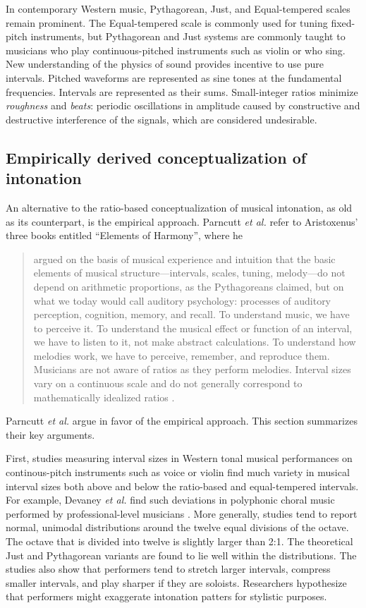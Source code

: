 In contemporary Western music, Pythagorean, Just, and Equal-tempered scales remain prominent. The Equal-tempered scale is commonly used for tuning fixed-pitch instruments, but Pythagorean and Just systems are commonly taught to musicians who play continuous-pitched instruments such as violin or who sing. New understanding of the physics of sound provides incentive to use pure intervals. Pitched waveforms are represented as sine tones at the fundamental frequencies. Intervals are represented as their sums. Small-integer ratios minimize \textit{roughness} and \textit{beats}: periodic oscillations in amplitude caused by constructive and destructive interference of the signals, which are considered undesirable.

\subsection{Empirically derived conceptualization of intonation}
\label{sec:empirical}
An alternative to the ratio-based conceptualization of musical intonation, as old as its counterpart, is the empirical approach. Parncutt \textit{et al.} refer to Aristoxenus' three books entitled ``Elements of Harmony'', where he \begin{quotation}argued on the basis of musical experience and intuition that the basic elements of musical structure---intervals, scales, tuning, melody---do not depend on arithmetic proportions, as the Pythagoreans claimed, but on what we today would call auditory psychology: processes of auditory perception, cognition, memory, and recall. To understand music, we have to perceive it. To understand the musical effect or function of an interval, we have to listen to it, not make abstract calculations. To understand how melodies work, we have to perceive, remember, and reproduce them. Musicians are not aware of ratios as they perform melodies. Interval sizes vary on a continuous scale and do not generally correspond to mathematically idealized ratios \cite[][p.~475]{parncutt2018psychocultural}.\end{quotation} 

Parncutt \textit{et al.} argue in favor of the empirical approach. This section summarizes their key arguments.

First, studies measuring interval sizes in Western tonal musical performances on continous-pitch instruments such as voice or violin find much variety in musical interval sizes both above and below the ratio-based and equal-tempered intervals. For example, Devaney \textit{et al.} find such deviations in polyphonic choral music performed by professional-level musicians \cite{devaney2011intonation}. More generally, studies tend to report normal, unimodal distributions around the twelve equal divisions of the octave. The octave that is divided into twelve is slightly larger than 2:1. The theoretical Just and Pythagorean variants are found to lie well within the distributions. The studies also show that performers tend to stretch larger intervals, compress smaller intervals, and play sharper if they are soloists. Researchers hypothesize that performers might exaggerate intonation patters for stylistic purposes. 

